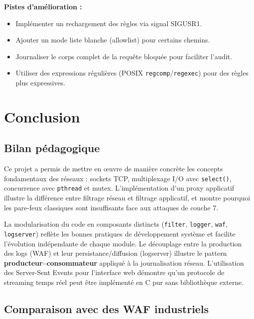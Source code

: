 \documentclass[12pt,a4paper]{article}
\begin{document}
\textbf{Pistes d'amélioration :}

\begin{itemize}
  \item Implémenter un rechargement des règles via signal SIGUSR1.
  \item Ajouter un mode liste blanche (allowlist) pour certains chemins.
  \item Journaliser le corps complet de la requête bloquée pour faciliter l'audit.
  \item Utiliser des expressions régulières (POSIX \texttt{regcomp}/\texttt{regexec}) pour des règles plus expressives.
\end{itemize}

\section{Conclusion}

\subsection{Bilan pédagogique}

Ce projet a permis de mettre en œuvre de manière concrète les concepts fondamentaux des réseaux : sockets TCP, multiplexage I/O avec \texttt{select()}, concurrence avec \texttt{pthread} et mutex. L'implémentation d'un proxy applicatif illustre la différence entre filtrage réseau et filtrage applicatif, et montre pourquoi les pare-feux classiques sont insuffisants face aux attaques de couche 7.

La modularisation du code en composants distincts (\texttt{filter}, \texttt{logger}, \texttt{waf}, \texttt{logserver}) reflète les bonnes pratiques de développement système et facilite l'évolution indépendante de chaque module. Le découplage entre la production des logs (WAF) et leur persistance/diffusion (logserver) illustre le pattern \textbf{producteur--consommateur} appliqué à la journalisation réseau. L'utilisation des Server-Sent Events pour l'interface web démontre qu'un protocole de streaming temps réel peut être implémenté en C pur sans bibliothèque externe.

\subsection{Comparaison avec des WAF industriels}
\end{document}
